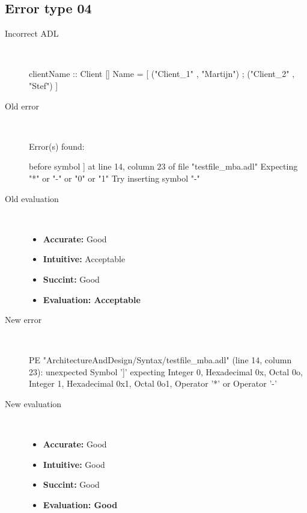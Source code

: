 \subsection{Error type 04}
  \begin{description}
  \item[Incorrect ADL]~\\
\begin{adl}
clientName :: Client [] Name =
    [ ("Client_1"      , "Martijn")
    ; ("Client_2"      , "Stef")
    ]\end{adl}
  \item[Old error]~\\
\begin{haskell}
Error(s) found:

before symbol ] at line 14, column 23 of file "testfile_mba.adl"
Expecting "*" or "-" or "0" or "1"
Try inserting symbol "-"

\end{haskell}
  \item[Old evaluation]~\\
    \begin{itemize}
    \item \textbf{Accurate:} Good
    \item \textbf{Intuitive:} Acceptable
    \item \textbf{Succint:} Good
    \item \textbf{Evaluation: Acceptable}
    \end{itemize}
  \item[New error]~\\
\begin{haskell}
PE "ArchitectureAndDesign/Syntax/testfile_mba.adl" (line 14, column 23):
unexpected Symbol ']'
expecting Integer 0, Hexadecimal 0x, Octal 0o, Integer 1, Hexadecimal 0x1, Octal 0o1, Operator '*' or Operator '-'\end{haskell}
  \item[New evaluation]~\\
    \begin{itemize}
    \item \textbf{Accurate:} Good
    \item \textbf{Intuitive:} Good
    \item \textbf{Succint:} Good
    \item \textbf{Evaluation: Good
}
    \end{itemize}
  \end{description}

\hrulefill

